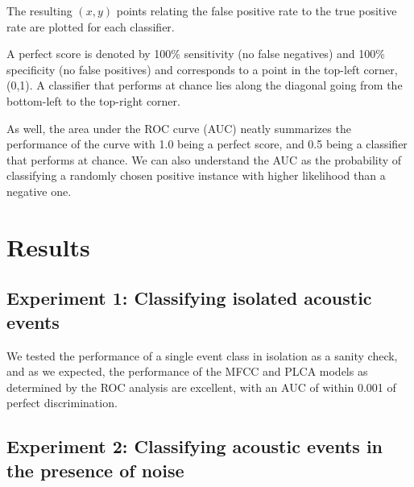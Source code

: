 \documentclass[a4paper,10pt,final]{ThesisStyle}
\begin{document}
The resulting $(x,y)$ points relating the false positive rate to the true positive rate are plotted for each classifier.

A perfect score is denoted by 100\% sensitivity (no false negatives) and 100\% specificity (no false positives) and corresponds to a point in the top-left corner, (0,1).  A classifier that performs at chance lies along the diagonal going from the bottom-left to the top-right corner.  

As well, the area under the ROC curve (AUC) neatly summarizes the performance of the curve with 1.0 being a perfect score, and 0.5 being a classifier that performs at chance.  We can also understand the AUC as the probability of classifying a randomly chosen positive instance with higher likelihood than a negative one.

\section{Results}

\subsection{Experiment 1: Classifying isolated acoustic events}

We tested the performance of a single event class in isolation as a sanity check, and as we expected, the performance of the MFCC and PLCA models as determined by the ROC analysis are excellent, with an AUC of within 0.001 of perfect discrimination.




\subsection{Experiment 2: Classifying acoustic events in the presence of noise}
\end{document}
